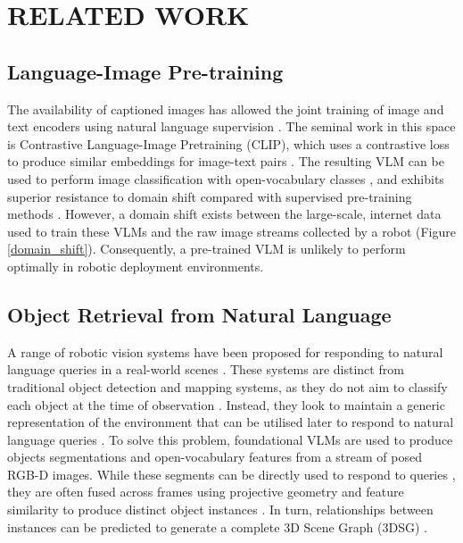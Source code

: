 \section{RELATED WORK}
\subsection{Language-Image Pre-training}
The availability of captioned images has allowed the joint training of image and text encoders using natural language supervision \cite{clip}. The seminal work in this space is Contrastive Language-Image Pretraining (CLIP), which uses a contrastive loss to produce similar embeddings for image-text pairs \cite{clip}. The resulting VLM can be used to perform image classification with open-vocabulary classes \cite{clip}, and exhibits superior resistance to domain shift compared with supervised pre-training methods \cite{clip, grounding_with_text}. 
However, a domain shift exists between the large-scale, internet data used to train these VLMs and the raw image streams collected by a robot \cite{seal} (Figure \ref{domain_shift}). Consequently, a pre-trained VLM is unlikely to perform optimally in robotic deployment environments.

\subsection{Object Retrieval from Natural Language}
A range of robotic vision systems have been proposed for responding to natural language queries in a real-world scenes \cite{clio, conceptgraphs, hovsg, bare, ovoslam}. These systems are distinct from traditional object detection and mapping systems, as they do not aim to classify each object at the time of observation \cite{kimera, multi-tsdfs}. Instead, they look to maintain a generic representation of the environment that can be utilised later to respond to natural language queries \cite{vlmap, lerf}. To solve this problem, foundational VLMs are used to produce objects segmentations \cite{segment_anything} and open-vocabulary features \cite{clip, detic, glip, owl, lseg} from a stream of posed RGB-D images. While these segments can be directly used to respond to queries \cite{bare}, they are often fused across frames using projective geometry and feature similarity to produce distinct object instances \cite{conceptgraphs, hovsg, clio, ovoslam}. In turn, relationships between instances can be predicted to generate a complete 3D Scene Graph (3DSG) \cite{conceptgraphs, hovsg, ovoslam}. 

